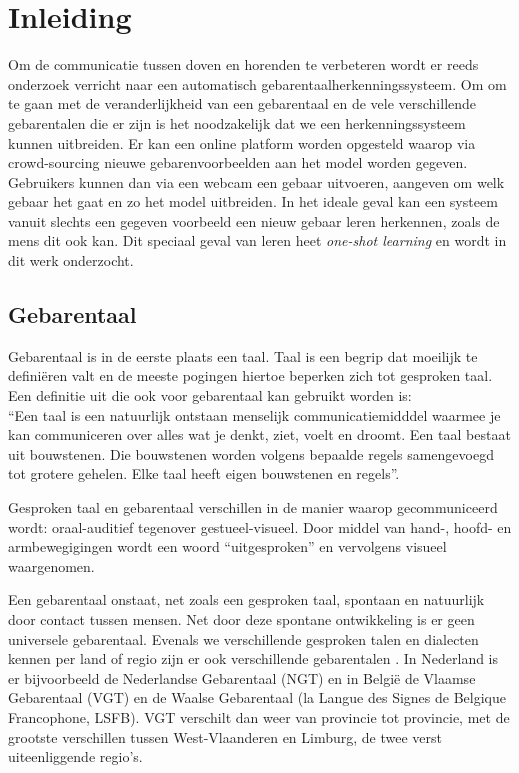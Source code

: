 \chapter{Inleiding}
Om de communicatie tussen doven en horenden te verbeteren wordt er reeds onderzoek verricht naar een automatisch gebarentaalherkenningssysteem. Om om te gaan met de veranderlijkheid van een gebarentaal en de vele verschillende gebarentalen die er zijn is het noodzakelijk dat we een herkenningssysteem kunnen uitbreiden. Er kan een online platform worden opgesteld waarop via crowd-sourcing nieuwe gebarenvoorbeelden aan het model worden gegeven. Gebruikers kunnen dan via een webcam een gebaar uitvoeren, aangeven om welk gebaar het gaat en zo het model uitbreiden.
\npar In het ideale geval kan een systeem vanuit slechts een gegeven voorbeeld een nieuw gebaar leren herkennen, zoals de mens dit ook kan. Dit speciaal geval van leren heet \textit{one-shot learning} en wordt in dit werk onderzocht.
\section{Gebarentaal}

Gebarentaal is in de eerste plaats een taal. Taal is een begrip dat moeilijk te defini\"eren valt en de meeste pogingen hiertoe beperken zich tot gesproken taal. Een definitie uit \cite{buyens_gebarentaaltolken_2003} die ook voor gebarentaal kan gebruikt worden is: 
\\``Een taal is een natuurlijk ontstaan menselijk communicatiemidddel waarmee je kan communiceren over alles wat je denkt, ziet, voelt en droomt. Een taal bestaat uit bouwstenen. Die bouwstenen worden volgens bepaalde regels samengevoegd tot grotere gehelen. Elke taal heeft eigen bouwstenen en regels''.

\npar Gesproken taal en gebarentaal verschillen in de manier waarop gecommuniceerd wordt: oraal-auditief tegenover gestueel-visueel. Door middel van hand-, hoofd- en armbewegigingen wordt een woord ``uitgesproken'' en vervolgens visueel waargenomen.

\npar Een gebarentaal onstaat, net zoals een gesproken taal, spontaan en natuurlijk door contact tussen mensen. Net door deze spontane ontwikkeling is er geen universele gebarentaal. Evenals we verschillende gesproken talen en dialecten kennen per land of regio zijn er ook verschillende gebarentalen \cite{VGT-standard}. In Nederland is er bijvoorbeeld de Nederlandse Gebarentaal (NGT) en in Belgi\"e de Vlaamse Gebarentaal (VGT) en de Waalse Gebarentaal (la Langue des Signes de Belgique Francophone, LSFB). VGT verschilt dan weer van provincie tot provincie, met de grootste verschillen tussen West-Vlaanderen en Limburg, de twee verst uiteenliggende regio's.

